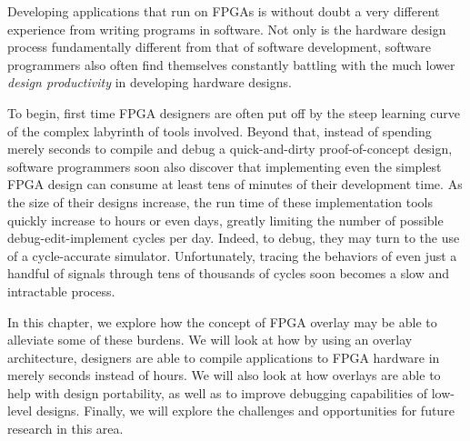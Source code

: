 Developing applications that run on FPGAs is without doubt a very different experience from writing programs in software.
Not only is the hardware design process fundamentally different from that of software development, software programmers also often find themselves constantly battling with the much lower \emph{design productivity} in developing hardware designs.

To begin, first time FPGA designers are often put off by the steep learning curve of the complex labyrinth of tools involved.
Beyond that, instead of spending merely seconds to compile and debug a quick-and-dirty proof-of-concept design, software programmers soon also discover that implementing even the simplest FPGA design can consume at least tens of minutes of their development time.
As the size of their designs increase, the run time of these implementation tools quickly increase to hours or even days, greatly limiting the number of possible debug-edit-implement cycles per day.
Indeed, to debug, they may turn to the use of a cycle-accurate simulator. 
Unfortunately, tracing the behaviors of even just a handful of signals through tens of thousands of cycles soon becomes a slow and intractable process.

In this chapter, we explore how the concept of FPGA overlay may be able to alleviate some of these burdens.
We will look at how by using an overlay architecture, designers are able to compile applications to FPGA hardware in merely seconds instead of hours.
We will also look at how overlays are able to help with design portability, as well as to improve debugging capabilities of low-level designs.
Finally, we will explore the challenges and opportunities for future research in this area.

